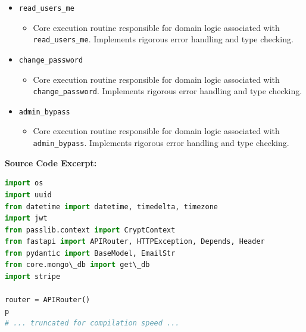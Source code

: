 \documentclass[10pt,journal,compsoc]{IEEEtran}
\begin{document}
\begin{itemize}
    \item \texttt{read\_users\_me}
    \begin{itemize} \item Core execution routine responsible for domain logic associated with \texttt{read\_users\_me}. Implements rigorous error handling and type checking. \end{itemize}
    \item \texttt{change\_password}
    \begin{itemize} \item Core execution routine responsible for domain logic associated with \texttt{change\_password}. Implements rigorous error handling and type checking. \end{itemize}
    \item \texttt{admin\_bypass}
    \begin{itemize} \item Core execution routine responsible for domain logic associated with \texttt{admin\_bypass}. Implements rigorous error handling and type checking. \end{itemize}
\end{itemize}
\textbf{Source Code Excerpt:}
\begin{lstlisting}[language=Python]
import os
import uuid
from datetime import datetime, timedelta, timezone
import jwt
from passlib.context import CryptContext
from fastapi import APIRouter, HTTPException, Depends, Header
from pydantic import BaseModel, EmailStr
from core.mongo\_db import get\_db
import stripe

router = APIRouter()
p
# ... truncated for compilation speed ...
\end{lstlisting}
\end{document}
